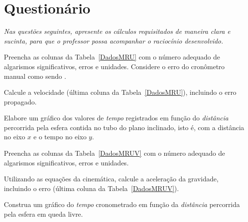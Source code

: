 \vspace{5mm}

\section{Questionário}
\emph{Nas questões seguintes, apresente os cálculos requisitados de maneira clara e sucinta, para que o professor possa acompanhar o raciocínio desenvolvido.}
\vspace{5mm}

\begin{question}[type={exam}]{2}
Preencha as colunas da Tabela~\ref{DadosMRU} com o número adequado de algarismos significativos, erros e unidades. Considere o erro do cronômetro manual como sendo .
\end{question}

\begin{question}[type={exam}]{1}
 Calcule a velocidade (última coluna da Tabela~\ref{DadosMRU}), incluindo o erro propagado. 
\end{question}

\begin{question}[type={exam}]{2.5}
Elabore um gráfico dos valores de \emph{tempo} registrados em função do \emph{distância} percorrida pela esfera contida no tubo do plano inclinado, isto é, com a distância no eixo $x$ e o tempo no eixo $y$.
\end{question}

\begin{question}[type={exam}]{1.5}
Preencha as colunas da Tabela~\ref{DadosMRUV} com o número adequado de algarismos significativos, erros e unidades.
\end{question}

\begin{question}[type={exam}]{1}
Utilizando as equações da cinemática, calcule a aceleração da gravidade, incluindo o erro (última coluna da Tabela~\ref{DadosMRUV}).
\end{question}

\begin{question}[type={exam}]{2.5}
Construa um gráfico do \emph{tempo} cronometrado em função da \emph{distância} percorrida pela esfera em queda livre.
\end{question}
\vfill
\pagebreak
